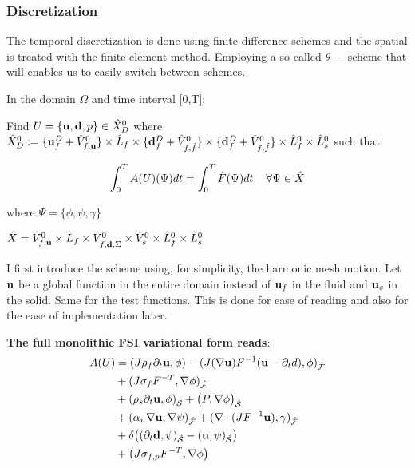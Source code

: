 \subsubsection{Discretization}

The temporal discretization is done using finite difference schemes and the spatial is treated with the finite element method. Employing a so called $\theta-$ scheme that will enables us to easily switch between schemes.

In the domain $\Omega$ and time interval [0,T]:

Find $ U = \{\bold{u}, \bold{d}, p\} \in \hat{X}^0_D $ where $ \hat{X}^0_D := \{ \bold{u}^D_f + \hat{V}^0_{f,\bold{u}} \} \times \hat{L}_f \times \{ \bold{d}_f^D + \hat{V}^0_{f,\hat{f}} \} \times \{ \bold{d}_f^D + \hat{V}^0_{f,\hat{f}} \} \times \hat{L}^0_f \times \hat{L}^0_s  $ such that:

\begin{equation}
\int_0^T A(U)(\Psi) dt = \int_0^T \hat{F}(\Psi) dt \hspace{4mm} \forall  \Psi \in \hat{X}
\end{equation}

where $ \Psi = \{\phi, \psi, \gamma \} $%

 $\hat{X} = \hat{V}^0_{f,\bold{u}} \times \hat{L}_f \times \hat{V}^0_{f,\bold{d},\hat{\Sigma}} \times \hat{V}_s^0 \times \hat{L}_f^0 \times \hat{L}_s^0  $


I first introduce the scheme using, for simplicity, the harmonic mesh motion. Let $\bold{u}$ be a global function in the entire domain instead of $\bold{u}_f$ in the fluid and $\bold{u}_s$ in the solid. Same for the test functions. This is done for ease of reading and also for the ease of implementation later.

\textbf{The full monolithic FSI variational form reads}:
\begin{align}
A(U)&= (J \rho_f \partial_t \bold{u} , \phi ) - (J (\nabla \bold{u})F^{-1}(\bold{u} - \partial_t d) , \phi )_{\mathcal{\hat{F}}}  \\
       &+ ( J \sigma_{f} F^{-T} , \nabla \phi )_{\mathcal{\hat{F}}} \\
       &+ (\rho_s \partial_t \bold{u} , \phi)_{\mathcal{\hat{S}}}   + \big(P, \nabla \phi \big)_{\mathcal{\hat{S}}} \\
       &+ ( \alpha_u \nabla \bold{u}, \nabla \psi)_{\mathcal{\hat{F}}} + (\nabla \cdot (J F^{-1} \bold{u}),\gamma )_{\mathcal{\hat{F}}} \\
       \label{eq:condition}
       &+ \delta\big((\partial_t \bold{d} , \psi)_{\mathcal{\hat{S}}}  - ( \bold{u} , \psi )_{\mathcal{\hat{S}}}\big) \\ 
       &+  \big( J \sigma_{f,p} F^{-T}, \nabla \phi  \big) 	 		
\end{align}

